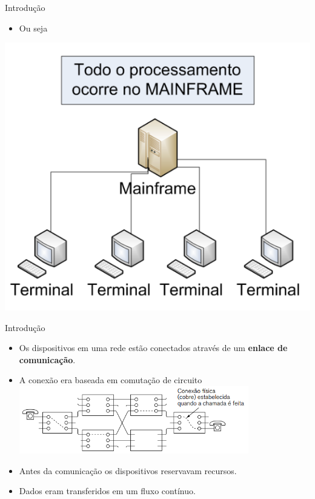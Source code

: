 \documentclass{libs/ufc_format}
\begin{document}
\begin{frame}{Introdução}
    \begin{itemize}
        \justifying
        \item Ou seja
    \end{itemize}
    \centering
    \includegraphics[scale=0.5]{media/mainframe4}
\end{frame}

\begin{frame}{Introdução}
    \begin{itemize}
        \justifying
        \item Os dispositivos em uma rede estão conectados através de um \textbf{enlace de comunicação}.
        \item<2-> A conexão era baseada em comutação de circuito\\
        \includegraphics[width=10cm]{media/Comutação Circuito}
        \item<3-> Antes da comunicação os dispositivos reservavam recursos.
        \item<4-> Dados eram transferidos em um fluxo contínuo.
    \end{itemize}
\end{frame}
\end{document}
